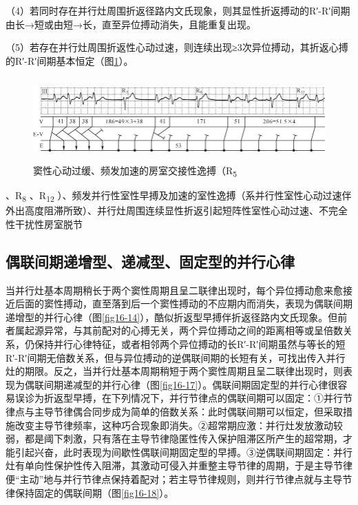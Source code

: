 （4）若同时存在并行灶周围折返径路内文氏现象，则其显性折返搏动的R′-R′间期由长→短或由短→长，直至异位搏动消失，且能重复出现。

（5）若存在并行灶周围折返性心动过速，则连续出现≥3次异位搏动，其折返心搏的R′-R′间期基本恒定（图\ref{fig16-16}）。

\begin{figure}[!htbp]
 \centering
 \includegraphics[width=5.73958in,height=1.26042in]{./images/Image00292.jpg}
 \captionsetup{justification=centering}
 \caption{窦性心动过缓、频发加速的房室交接性逸搏（R\textsubscript{5}}
 \label{fig16-16}
  \end{figure} 
、R\textsubscript{8} 、R\textsubscript{12}
）、频发并行性室性早搏及加速的室性逸搏（系并行性室性心动过速伴外出高度阻滞所致）、并行灶周围连续显性折返引起短阵性室性心动过速、不完全性干扰性房室脱节

\protect\hypertarget{text00023.htmlux5cux23subid292}{}{}

\subsection{偶联间期递增型、递减型、固定型的并行心律}

当并行灶基本周期稍长于两个窦性周期且呈二联律出现时，每个异位搏动愈来愈接近后面的窦性搏动，直至落到后一个窦性搏动的不应期内而消失，表现为偶联间期递增型的并行心律（图\ref{fig16-14}），酷似折返型早搏伴折返径路内文氏现象。但前者属起源异常，与其前配对的心搏无关，两个异位搏动之间的距离相等或呈倍数关系，仍保持并行心律特征，或者相邻两个异位搏动的长R′-R′间期虽然与等长的短R′-R′间期无倍数关系，但与异位搏动的逆偶联间期的长短有关，可找出传入并行灶的期限。反之，当并行灶基本周期稍短于两个窦性周期且呈二联律出现时，则表现为偶联间期递减型的并行心律（图\ref{fig16-17}）。偶联间期固定型的并行心律很容易误诊为折返型早搏，在下列情况下，并行节律点的偶联间期可以固定：①并行节律点与主导节律偶合同步成为简单的倍数关系：此时偶联间期可以恒定，但采取措施改变主导节律频率，这种巧合现象即消失。②超常期应激：并行灶发放激动较弱，都是阈下刺激，只有落在主导节律隐匿性传入保护阻滞区所产生的超常期，才能引起兴奋，此时表现为间歇性偶联间期固定型的早搏。③逆偶联间期固定：并行灶有单向性保护性传入阻滞，其激动可侵入并重整主导节律的周期，于是主导节律便“主动”地与并行节律点保持着配对；若主导节律规则，则并行节律点就与主导节律保持固定的偶联间期（图\ref{fig16-18}）。

